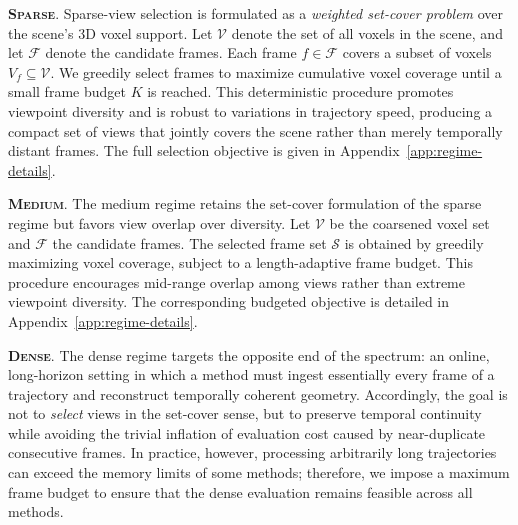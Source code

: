 \textbf{\textsc{Sparse}}.
Sparse-view selection is formulated as a \textit{weighted set-cover problem} over the scene's 3D voxel support.
%
Let $\mathcal{V}$ denote the set of all voxels in the scene, and let $\mathcal{F}$ denote the candidate frames.
%
Each frame $f \in \mathcal{F}$ covers a subset of voxels $V_f \subseteq \mathcal{V}$.
%
We greedily select frames to maximize cumulative voxel coverage until a small frame budget $K$ is reached.
%
This deterministic procedure promotes viewpoint diversity and is robust to variations in trajectory speed, producing a compact set of views that jointly covers the scene rather than merely temporally distant frames.
%
The full selection objective is given in Appendix~\ref{app:regime-details}.

\textbf{\textsc{Medium}}.
The medium regime retains the set-cover formulation of the sparse regime but favors view overlap over diversity.
%
Let $\mathcal{V}$ be the coarsened voxel set and $\mathcal{F}$ the candidate frames.
%
The selected frame set $\mathcal{S}$ is obtained by greedily maximizing voxel coverage, subject to a length-adaptive frame budget.
%
This procedure encourages mid-range overlap among views rather than extreme viewpoint diversity.
%
The corresponding budgeted objective is detailed in Appendix~\ref{app:regime-details}.

\textbf{\textsc{Dense}}.
The dense regime targets the opposite end of the spectrum: an online, long-horizon setting in which a method must ingest essentially every frame of a trajectory and reconstruct temporally coherent geometry. 
%
Accordingly, the goal is not to \emph{select} views in the set-cover sense, but to preserve temporal continuity while avoiding the trivial inflation of evaluation cost caused by near-duplicate consecutive frames. 
%
In practice, however, processing arbitrarily long trajectories can exceed the memory limits of some methods; therefore, we impose a maximum frame budget to ensure that the dense evaluation remains feasible across all methods.


